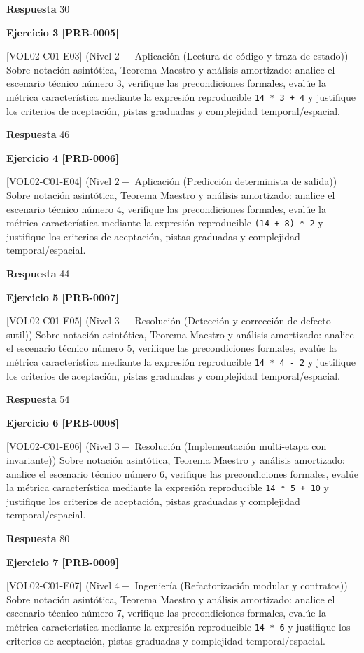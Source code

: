 \documentclass{book}
\begin{document}
\noindent\textbf{Respuesta} 30

\noindent\textbf{Ejercicio 3 [PRB-0005]}

[VOL02-C01-E03] (Nivel \(2 -\) Aplicación (Lectura de código y traza de estado)) Sobre notación asintótica, Teorema Maestro y análisis amortizado: analice el escenario técnico número 3, verifique las precondiciones formales, evalúe la métrica característica mediante la expresión reproducible \texttt{14 * 3 + 4} y justifique los criterios de aceptación, pistas graduadas y complejidad temporal/espacial.

\noindent\textbf{Respuesta} 46

\noindent\textbf{Ejercicio 4 [PRB-0006]}

[VOL02-C01-E04] (Nivel \(2 -\) Aplicación (Predicción determinista de salida)) Sobre notación asintótica, Teorema Maestro y análisis amortizado: analice el escenario técnico número 4, verifique las precondiciones formales, evalúe la métrica característica mediante la expresión reproducible \texttt{(14 + 8) * 2} y justifique los criterios de aceptación, pistas graduadas y complejidad temporal/espacial.

\noindent\textbf{Respuesta} 44

\noindent\textbf{Ejercicio 5 [PRB-0007]}

[VOL02-C01-E05] (Nivel \(3 -\) Resolución (Detección y corrección de defecto sutil)) Sobre notación asintótica, Teorema Maestro y análisis amortizado: analice el escenario técnico número 5, verifique las precondiciones formales, evalúe la métrica característica mediante la expresión reproducible \texttt{14 * 4 - 2} y justifique los criterios de aceptación, pistas graduadas y complejidad temporal/espacial.

\noindent\textbf{Respuesta} 54

\noindent\textbf{Ejercicio 6 [PRB-0008]}

[VOL02-C01-E06] (Nivel \(3 -\) Resolución (Implementación multi-etapa con invariante)) Sobre notación asintótica, Teorema Maestro y análisis amortizado: analice el escenario técnico número 6, verifique las precondiciones formales, evalúe la métrica característica mediante la expresión reproducible \texttt{14 * 5 + 10} y justifique los criterios de aceptación, pistas graduadas y complejidad temporal/espacial.

\noindent\textbf{Respuesta} 80

\noindent\textbf{Ejercicio 7 [PRB-0009]}

[VOL02-C01-E07] (Nivel \(4 -\) Ingeniería (Refactorización modular y contratos)) Sobre notación asintótica, Teorema Maestro y análisis amortizado: analice el escenario técnico número 7, verifique las precondiciones formales, evalúe la métrica característica mediante la expresión reproducible \texttt{14 * 6} y justifique los criterios de aceptación, pistas graduadas y complejidad temporal/espacial.
\end{document}
